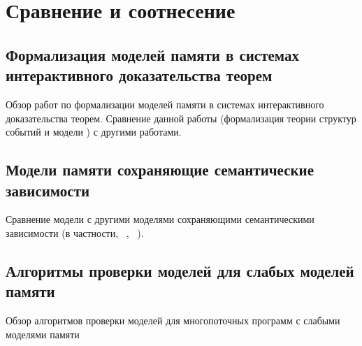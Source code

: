\chapter{Сравнение и соотнесение}
\label{ch:related-work}

\section{Формализация моделей памяти в системах интерактивного доказательства теорем}

Обзор работ по формализации моделей памяти
в системах интерактивного доказательства теорем.
Сравнение данной работы (формализация теории структур событий
и модели \Wkm) с другими работами.

\section{Модели памяти сохраняющие семантические зависимости}

Сравнение модели \WkmS с другими моделями
сохраняющими семантическими зависимости
(в частности, \Prm~\cite{Kang-al:POPL17}, \PwP~\cite{Jagadeesan-al:OOPSLA2020}).

\section{Алгоритмы проверки моделей для слабых моделей памяти}

Обзор алгоритмов проверки моделей для многопоточных программ 
с слабыми моделями памяти
